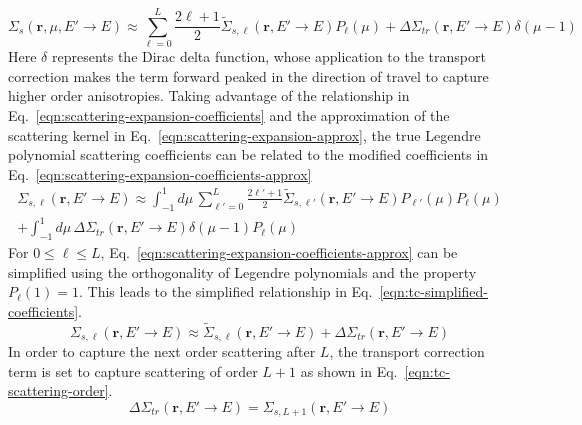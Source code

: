 \begin{appendices}
\begin{equation}
\Sigma_{s}(\mathbf{r}, \mu, {E'\rightarrow E}) \approx \sum_{\ell=0}^L \frac{2 \ell + 1}{2} \tilde{\Sigma}_{s,\ell}\left(\mathbf{r}, E'\rightarrow E \right) P_\ell(\mu) + \Delta \Sigma_{\textit{tr}}\left(\mathbf{r}, E'\rightarrow E \right) \delta\left(\mu - 1\right)
\label{eqn:scattering-expansion-approx}
\end{equation}
Here $\delta$ represents the Dirac delta function, whose application to the transport correction makes the term forward peaked in the direction of travel to capture higher order anisotropies. Taking advantage of the relationship in Eq.~\ref{eqn:scattering-expansion-coefficients} and the approximation of the scattering kernel in Eq.~\ref{eqn:scattering-expansion-approx}, the true Legendre polynomial scattering coefficients can be related to the modified coefficients in Eq.~\ref{eqn:scattering-expansion-coefficients-approx}
\begin{equation}
\begin{split}
\Sigma_{s,\ell}\left(\mathbf{r}, E'\rightarrow E \right) \approx \int_{-1}^{1} d\mu \, \sum_{\ell'=0}^L \frac{2 \ell' + 1}{2} \tilde{\Sigma}_{s,\ell'}\left(\mathbf{r}, E'\rightarrow E \right) P_{\ell'}(\mu) P_\ell(\mu) \\ + \int_{-1}^{1} d\mu \, \Delta \Sigma_{\textit{tr}}\left(\mathbf{r}, E'\rightarrow E \right) \delta\left(\mu - 1\right) P_\ell(\mu)
\label{eqn:scattering-expansion-coefficients-approx}
\end{split}
\end{equation}
For $0 \leq \ell \leq L$, Eq.~\ref{eqn:scattering-expansion-coefficients-approx} can be simplified using the orthogonality of Legendre polynomials and the property $P_\ell(1) = 1$. This leads to the simplified relationship in Eq.~\ref{eqn:tc-simplified-coefficients}.
\begin{equation}
\Sigma_{s,\ell}\left(\mathbf{r}, E'\rightarrow E \right) \approx  \tilde{\Sigma}_{s,\ell}\left(\mathbf{r}, E'\rightarrow E \right) + \Delta \Sigma_{\textit{tr}}\left(\mathbf{r}, E'\rightarrow E \right)
\label{eqn:tc-simplified-coefficients}
\end{equation}
In order to capture the next order scattering after $L$, the transport correction term is set to capture scattering of order $L+1$ as shown in Eq.~\ref{eqn:tc-scattering-order}.
\begin{equation}
\Delta \Sigma_{\textit{tr}}\left(\mathbf{r}, E'\rightarrow E \right) = \Sigma_{s,L+1}\left(\mathbf{r}, E'\rightarrow E \right)
\label{eqn:tc-scattering-order}
\end{equation}

\end{appendices}
